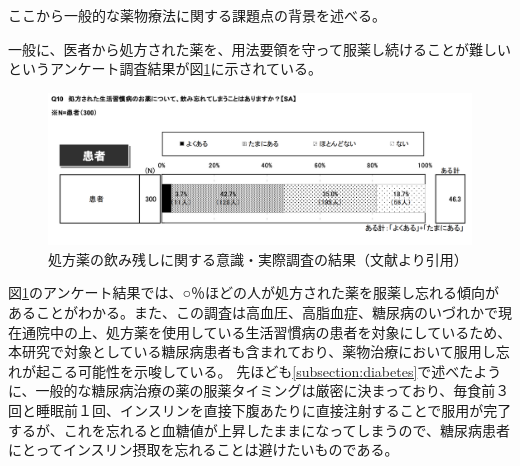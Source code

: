 ここから一般的な薬物療法に関する課題点の背景を述べる。

一般に、医者から処方された薬を、用法要領を守って服薬し続けることが難しいというアンケート調査結果が図\ref{fig:forget_medicine_number}に示されている。

\begin{figure}[htbp]
  \caption{処方薬の飲み残しに関する意識・実際調査の結果（文献\cite{drug_treatment_investigation}より引用）}
  \label{fig:forget_medicine_number}
  \begin{center}
    \includegraphics[bb=0 0 1000 400,width=15cm]{assets/forget_medicine_number.png}
  \end{center}
\end{figure}

図\ref{fig:forget_medicine_number}のアンケート結果では、○％ほどの人が処方された薬を服薬し忘れる傾向があることがわかる。また、この調査は高血圧、高脂血症、糖尿病のいづれかで現在通院中の上、処方薬を使用している生活習慣病の患者を対象にしている\cite{drug_treatment_investigation}ため、本研究で対象としている糖尿病患者も含まれており、薬物治療において服用し忘れが起こる可能性を示唆している。
先ほども\ref{subsection:diabetes}で述べたように、一般的な糖尿病治療の薬の服薬タイミングは厳密に決まっており、毎食前３回と睡眠前１回、インスリンを直接下腹あたりに直接注射することで服用が完了するが、これを忘れると血糖値が上昇したままになってしまうので、糖尿病患者にとってインスリン摂取を忘れることは避けたいものである。
